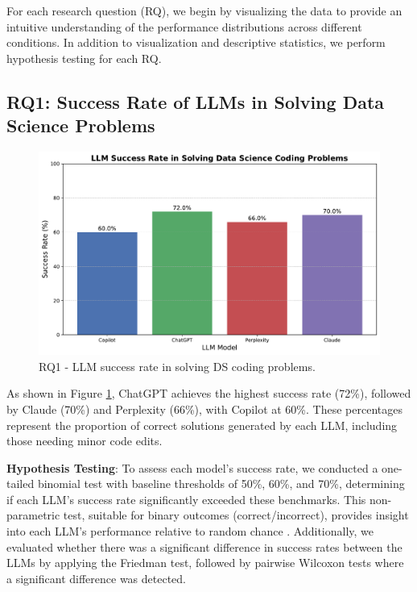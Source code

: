\documentclass[conference]{IEEEtran}
\begin{document}
For each research question (RQ), we begin by visualizing the data to provide an intuitive understanding of the performance distributions across different conditions. In addition to visualization and descriptive statistics, we perform hypothesis testing for each RQ. 

\subsection{RQ1: Success Rate of LLMs in Solving Data Science Problems}

\begin{figure}[!ht]
    \centering
    \includegraphics[width=0.90\linewidth]{figures/results/RQ1.pdf}
    \caption{RQ1 - LLM success rate in solving DS coding problems.}
    \label{fig:overall-success-rate}
\end{figure}

As shown in Figure \ref{fig:overall-success-rate}, ChatGPT achieves the highest success rate (72\%), followed by Claude (70\%) and Perplexity (66\%), with Copilot at 60\%. These percentages represent the proportion of correct solutions generated by each LLM, including those needing minor code edits.

\textbf{Hypothesis Testing}: To assess each model's success rate, we conducted a one-tailed binomial test with baseline thresholds of 50\%, 60\%, and 70\%, determining if each LLM’s success rate significantly exceeded these benchmarks. This non-parametric test, suitable for binary outcomes (correct/incorrect), provides insight into each LLM’s performance relative to random chance \cite{wohlin2012experimentation}. Additionally, we evaluated whether there was a significant difference in success rates between the LLMs by applying the Friedman test, followed by pairwise Wilcoxon tests where a significant difference was detected.
\end{document}
